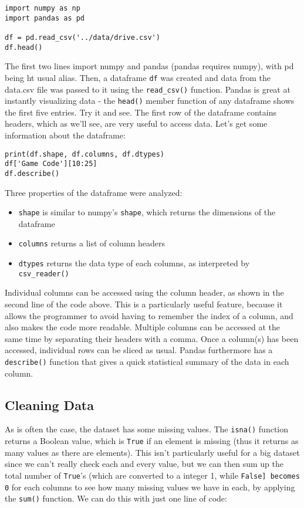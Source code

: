 \documentclass[12pt]{article}
\newcommand{\code}{\texttt}
\begin{document}
\begin{lstlisting}[frame=single] 
import numpy as np
import pandas as pd

df = pd.read_csv('../data/drive.csv')
df.head()
\end{lstlisting}

The first two lines import numpy and pandas (pandas requires numpy), with pd being ht usual alias. Then, a dataframe \code{df} was created and data from the data.csv file was passed to it using the \code{read\_csv()} function. Pandas is great at instantly visualizing data - the \code{head()} member function of any dataframe shows the first five entries. Try it and see. The first row of the dataframe contains headers, which as we'll see, are very useful to access data. Let's get some information about the dataframe:

\begin{lstlisting}[frame=single] 
print(df.shape, df.columns, df.dtypes)
df['Game Code'][10:25]
df.describe()
\end{lstlisting}

Three properties of the dataframe were analyzed:

\begin{itemize}
	\item \code{shape} is similar to numpy's \code{shape}, which returns the dimensions of the dataframe
	\item \code{columns} returns a list of column headers
	\item \code{dtypes} returns the data type of each columns, as interpreted by \code{csv\_reader()}
\end{itemize}

Individual columns can be accessed using the column header, as shown in the second line of the code above. This is a particularly useful feature, because it allows the programmer to avoid having to remember the index of a column, and also makes the code more readable. Multiple columns can be accessed at the same time by separating their headers with a comma. Once a column(s) has been accessed, individual rows can be sliced as usual. Pandas furthermore has a \code{describe()} function that gives a quick statistical summary of the data in each column.

\subsection{Cleaning Data}
As is often the case, the dataset has some missing values. The \code{isna()} function returns a Boolean value, which is \code{True} if an element is missing (thus it returns as many values as there are elements). This isn't particularly useful for a big dataset since we can't really check each and every value, but we can then sum up the total number of \code{True}'s (which are converted to a integer 1, while \code{False] becomes 0} for each columns to see how many missing values we have in each, by applying the \code{sum()} function. We can do this with just one line of code:
\end{document}
